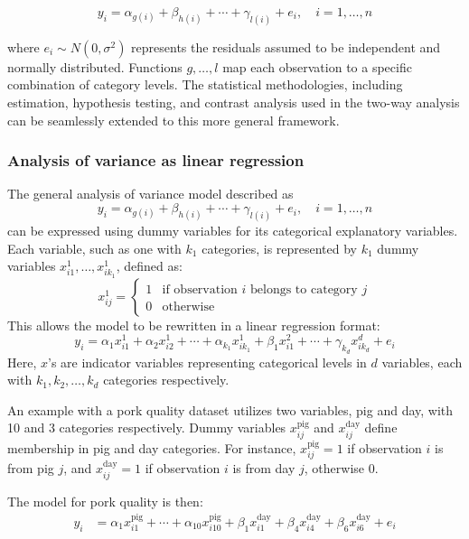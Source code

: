 \documentclass{article}
\begin{document}
\begin{equation*}
y_{i} = \alpha_{g(i)} + \beta_{h(i)} + \cdots + \gamma_{l(i)} + e_{i}, \quad i = 1, \ldots, n
\end{equation*}

where $e_i \sim N(0, \sigma^2)$ represents the residuals assumed to be independent and normally distributed. Functions $g, \ldots, l$ map each observation to a specific combination of category levels. The statistical methodologies, including estimation, hypothesis testing, and contrast analysis used in the two-way analysis can be seamlessly extended to this more general framework.


\subsubsection{Analysis of variance as linear regression}
The general analysis of variance model described as
\begin{equation*}
y_{i}=\alpha_{g(i)}+\beta_{h(i)}+\cdots+\gamma_{l(i)}+e_{i}, \quad i=1, \ldots, n
\end{equation*}
can be expressed using dummy variables for its categorical explanatory variables. Each variable, such as one with $k_1$ categories, is represented by $k_1$ dummy variables $x_{i1}^1, \ldots, x_{ik_1}^1$, defined as:
\[
x_{ij}^1= 
\begin{cases}
1 & \text{if observation } i \text{ belongs to category } j\\
0 & \text{otherwise}
\end{cases}
\]
This allows the model to be rewritten in a linear regression format:
\begin{equation*}
y_{i} = \alpha_1 x_{i1}^1 + \alpha_2 x_{i2}^1 + \cdots + \alpha_{k_1} x_{ik_1}^1 + \beta_1 x_{i1}^2 + \cdots + \gamma_{k_d} x_{ik_d}^d + e_{i}
\end{equation*}
Here, $x$'s are indicator variables representing categorical levels in $d$ variables, each with $k_1, k_2, \ldots, k_d$ categories respectively.

An example with a pork quality dataset utilizes two variables, pig and day, with 10 and 3 categories respectively. Dummy variables $x_{ij}^{\text{pig}}$ and $x_{ij}^{\text{day}}$ define membership in pig and day categories. For instance, $x_{ij}^{\text{pig}} = 1$ if observation $i$ is from pig $j$, and $x_{ij}^{\text{day}} = 1$ if observation $i$ is from day $j$, otherwise 0.

The model for pork quality is then:
\begin{align*}
y_{i} & = \alpha_1 x_{i1}^{\text{pig}} + \cdots + \alpha_{10} x_{i10}^{\text{pig}} + \beta_1 x_{i1}^{\text{day}} + \beta_4 x_{i4}^{\text{day}} + \beta_6 x_{i6}^{\text{day}} + e_{i} 
\end{align*}
\end{document}
